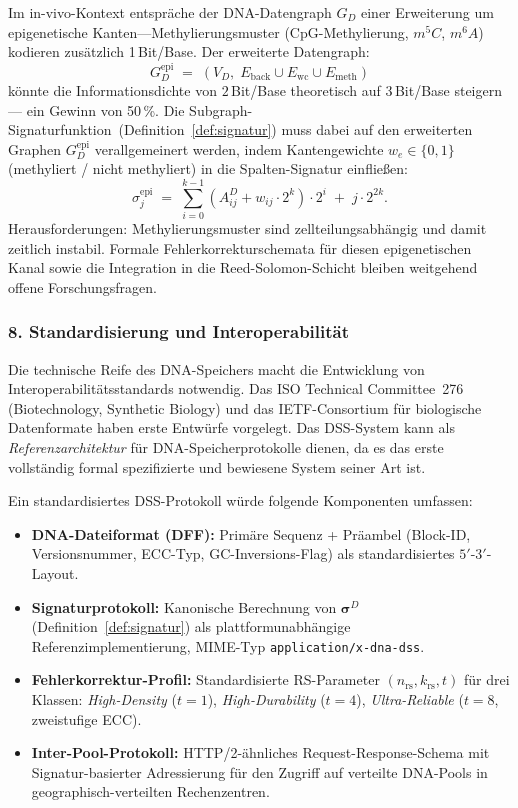 ﻿\documentclass[a4paper,12pt]{article}
\theoremstyle{definition}
\begin{document}
Im in-vivo-Kontext entspr\"{a}che der DNA-Datengraph $G_D$ einer
Erweiterung um epige\-netische Kanten---Methylierungsmuster
(CpG-Methylierung, $m^5C$, $m^6A$) kodieren zus\"{a}tzlich 1\,Bit/Base.
Der erweiterte Datengraph:
\[
    G_D^{\mathrm{epi}} \;=\;
    (V_D,\; E_{\mathrm{back}} \cup E_{\mathrm{wc}} \cup E_{\mathrm{meth}})
\]
k\"{o}nnte die Informationsdichte von $2$\,Bit/Base theoretisch auf
$3$\,Bit/Base steigern --- ein Gewinn von 50\,\%.
Die Subgraph-Signaturfunktion~(Definition~\ref{def:signatur}) muss dabei
auf den erweiterten Graphen $G_D^{\mathrm{epi}}$ verallgemeinert werden,
indem Kantengewichte $w_e \in \{0,1\}$ (methyliert / nicht methyliert)
in die Spalten-Signatur einflie\ss{}en:
\[
    \sigma_j^{\mathrm{epi}} \;=\; \sum_{i=0}^{k-1}
    (A^D_{ij} + w_{ij} \cdot 2^k) \cdot 2^i \;+\; j \cdot 2^{2k}.
\]
Herausforderungen: Methylierungs\-muster sind zellteilungsabh\"{a}ngig
und damit zeitlich instabil. Formale Fehlerkorrekturschemata f\"{u}r diesen
epigenetischen Kanal sowie die Integration in die Reed-Solomon-Schicht bleiben
weitgehend offene Forschungsfragen.

\subsubsection*{8.\; Standardisierung und Interoperabilit\"{a}t}

Die technische Reife des DNA-Speichers macht die Entwicklung von
Interoperabilit\"{a}tsstan\-dards notwendig.
Das ISO Technical Committee~276 (Biotechnology, Synthetic Biology)
und das IETF-Consortium f\"{u}r biologische Datenformate haben erste
Entw\"{u}rfe vorgelegt.
Das DSS-System kann als \emph{Referenzarchitektur} f\"{u}r DNA-Speicher\-protokolle
dienen, da es das erste vollst\"{a}ndig formal spezifizierte und bewiesene
System seiner Art ist.

Ein standardisiertes DSS-Protokoll w\"{u}rde folgende Komponenten umfassen:
\begin{itemize}
    \item \textbf{DNA-Dateiformat (DFF):}
          Prim\"{a}re Sequenz + Pr\"{a}ambel
          (Block-ID, Versionsnummer, ECC-Typ, GC-Inversions-Flag)
          als standardisiertes $5'$-$3'$-Layout.
    \item \textbf{Signaturprotokoll:}
          Kanonische Berechnung von $\boldsymbol{\sigma}^D$
          (Definition~\ref{def:signatur}) als plattformunabh\"{a}ngige
          Referenz\-implementierung, MIME-Typ \texttt{application/x-dna-dss}.
    \item \textbf{Fehlerkorrektur-Profil:}
          Standardisierte RS-Parameter $(n_{\mathrm{rs}}, k_{\mathrm{rs}}, t)$
          f\"{u}r drei Klassen:
          \emph{High-Density} ($t=1$),
          \emph{High-Durability} ($t=4$),
          \emph{Ultra-Reliable} ($t=8$, zweistufige ECC).
    \item \textbf{Inter-Pool-Protokoll:}
          HTTP/2-\"{a}hnliches Request-Response-Schema mit Signatur-basierter
          Adressierung f\"{u}r den Zugriff auf verteilte DNA-Pools in
          geographisch-verteilten Rechenzentren.
\end{itemize}
\end{document}
